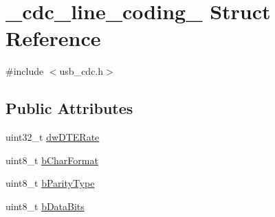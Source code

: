 \hypertarget{struct__cdc__line__coding__}{\section{\-\_\-cdc\-\_\-line\-\_\-coding\-\_\- Struct Reference}
\label{struct__cdc__line__coding__}
}


{\ttfamily \#include $<$usb\-\_\-cdc.\-h$>$}

\subsection*{Public Attributes}
\begin{DoxyCompactItemize}
\item 
uint32\-\_\-t \hyperlink{struct__cdc__line__coding___af5653e0a5c72e957e563c9fa04e7190c}{dw\-D\-T\-E\-Rate}
\item 
uint8\-\_\-t \hyperlink{struct__cdc__line__coding___a381a7e4871c57edc4ea9fec514fb25ab}{b\-Char\-Format}
\item 
uint8\-\_\-t \hyperlink{struct__cdc__line__coding___a8f41fe2fe3782ce98f2547dcf11e3eb6}{b\-Parity\-Type}
\item 
uint8\-\_\-t \hyperlink{struct__cdc__line__coding___a46de2797242a70a9df4f7a09a4571bbe}{b\-Data\-Bits}
\end{DoxyCompactItemize}



